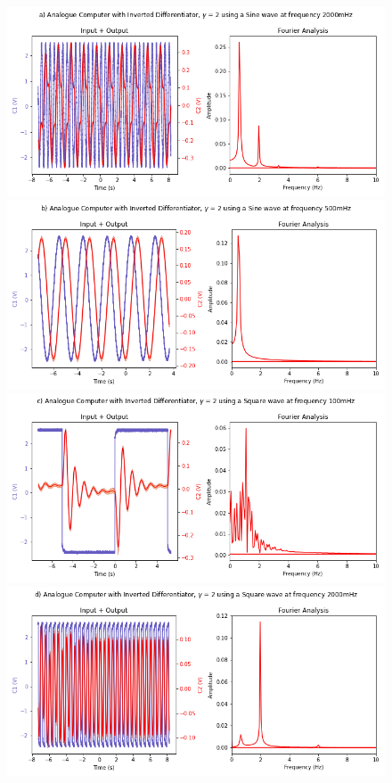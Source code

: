 \documentclass[journal]{Imperial_lab_report}
\begin{document}
\begin{appendices}
\begin{figure}
            \label{Inverted Diff G 2 Graphs}
            \centering
            \includegraphics[scale = 0.30]{INVERTED DIFF G 2 N_2000.png}
            \includegraphics[scale = 0.30]{INVERTED DIFF G 2 N_500.png}
            \includegraphics[scale = 0.30]{INVERTED DIFF G 2 S_100.png}
            \includegraphics[scale = 0.30]{INVERTED DIFF G 2 S_2000.png}

\end{figure}
\end{appendices}
\end{document}

